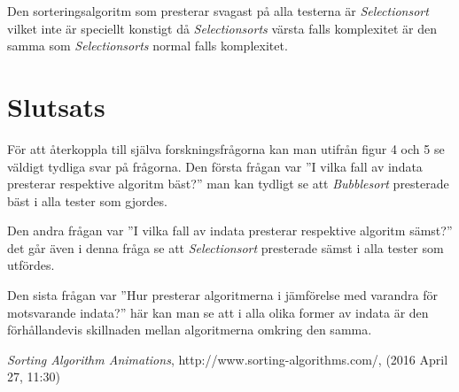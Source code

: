 \documentclass[a4paper]{article}
\begin{document}
Den sorteringsalgoritm som presterar svagast på alla testerna är \emph{Selectionsort} vilket inte är speciellt konstigt då \emph{Selectionsorts} värsta falls komplexitet är den samma som \emph{Selectionsorts} normal falls komplexitet. 

\section{Slutsats}
För att återkoppla till själva forskningsfrågorna kan man utifrån figur 4 och 5 se väldigt tydliga svar på frågorna. Den första frågan var ''I vilka fall av indata presterar respektive algoritm bäst?'' man kan tydligt se att \emph{Bubblesort} presterade bäst i alla tester som gjordes.

Den andra frågan var ''I vilka fall av indata presterar respektive algoritm sämst?'' det går även i denna fråga se att \emph{Selectionsort} presterade sämst i alla tester som utfördes.

Den sista frågan var ''Hur presterar algoritmerna i jämförelse med varandra för motsvarande indata?'' här kan man se att i alla olika former av indata är den förhållandevis skillnaden mellan algoritmerna omkring den samma.

\begin{thebibliography}{99}
	 \emph{Sorting Algorithm Animations}, http://www.sorting-algorithms.com/, (2016 April 27, 11:30)
\end{thebibliography}
\end{document}
